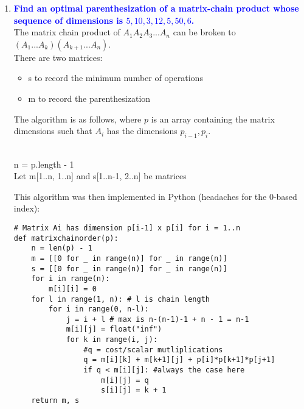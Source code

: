 \documentclass[11pt]{article}
\begin{document}
\begin{enumerate}
    
\item \textbf{\textcolor{blue}{Find an optimal parenthesization of a matrix-chain product whose sequence of dimensions is $5,10,3,12,5,50,6$.}}
    \\ The matrix chain product of $A_1A_2A_3...A_n$ can be broken to $(A_1...A_k)(A_{k+1}...A_n)$.
    \\ There are two matrices:
    \begin{itemize}
        \item s to record the minimum number of operations
        \item m to record the parenthesization
    \end{itemize}
    The algorithm is as follows, where $p$ is an array containing the matrix dimensions such that $A_i$ has the dimensions $p_{i-1}, p_i$.
    \\
    \begin{algorithm}[H]
        \Indm{}\\
        \Indp
            n = p.length - 1 \\
            Let m[1..n, 1..n] and s[1..n-1, 2..n] be matrices \\
    \end{algorithm}
    This algorithm was then implemented in Python (headaches for the 0-based index):
    \begin{verbatim}
# Matrix Ai has dimension p[i-1] x p[i] for i = 1..n
def matrixchainorder(p):
    n = len(p) - 1
    m = [[0 for _ in range(n)] for _ in range(n)]
    s = [[0 for _ in range(n)] for _ in range(n)]
    for i in range(n):
        m[i][i] = 0
    for l in range(1, n): # l is chain length
        for i in range(0, n-l):
            j = i + l # max is n-(n-1)-1 + n - 1 = n-1 
            m[i][j] = float("inf")
            for k in range(i, j):
                #q = cost/scalar mutliplications
                q = m[i][k] + m[k+1][j] + p[i]*p[k+1]*p[j+1]
                if q < m[i][j]: #always the case here
                    m[i][j] = q
                    s[i][j] = k + 1
    return m, s


\end{verbatim}
\end{enumerate}
\end{document}
